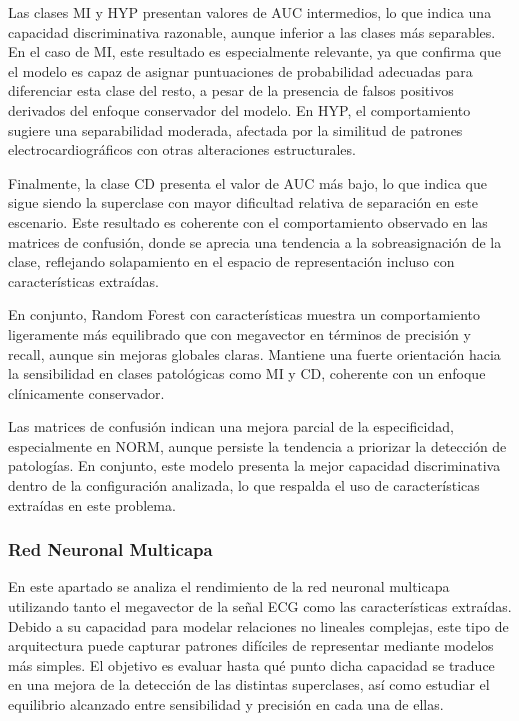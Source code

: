 \documentclass[12pt,a4paper,twoside]{book}
\begin{document}
Las clases MI y HYP presentan valores de AUC intermedios, lo que indica una capacidad discriminativa razonable, aunque inferior a las clases más separables. 
En el caso de MI, este resultado es especialmente relevante, ya que confirma que el modelo es capaz de asignar puntuaciones de probabilidad adecuadas para diferenciar esta clase del resto, a pesar de la presencia de falsos positivos derivados del enfoque conservador del modelo. 
En HYP, el comportamiento sugiere una separabilidad moderada, afectada por la similitud de patrones electrocardiográficos con otras alteraciones estructurales.

Finalmente, la clase CD presenta el valor de AUC más bajo, lo que indica que sigue siendo la superclase con mayor dificultad relativa de separación en este escenario. 
Este resultado es coherente con el comportamiento observado en las matrices de confusión, donde se aprecia una tendencia a la sobreasignación de la clase, reflejando solapamiento en el espacio de representación incluso con características extraídas.

\vspace{0.5cm}

En conjunto, Random Forest con características muestra un comportamiento ligeramente más equilibrado que con megavector en términos de precisión y recall, aunque sin mejoras globales claras. 
Mantiene una fuerte orientación hacia la sensibilidad en clases patológicas como MI y CD, coherente con un enfoque clínicamente conservador.

Las matrices de confusión indican una mejora parcial de la especificidad, especialmente en NORM, aunque persiste la tendencia a priorizar la detección de patologías. 
En conjunto, este modelo presenta la mejor capacidad discriminativa dentro de la configuración analizada, lo que respalda el uso de características extraídas en este problema.

\subsubsection*{Red Neuronal Multicapa}

En este apartado se analiza el rendimiento de la red neuronal multicapa utilizando tanto el megavector de la señal ECG como las características extraídas. Debido a su capacidad para modelar relaciones no lineales complejas, este tipo de arquitectura puede capturar patrones difíciles de representar mediante modelos más simples. 
El objetivo es evaluar hasta qué punto dicha capacidad se traduce en una mejora de la detección de las distintas superclases, así como estudiar el equilibrio alcanzado entre sensibilidad y precisión en cada una de ellas.
\end{document}
